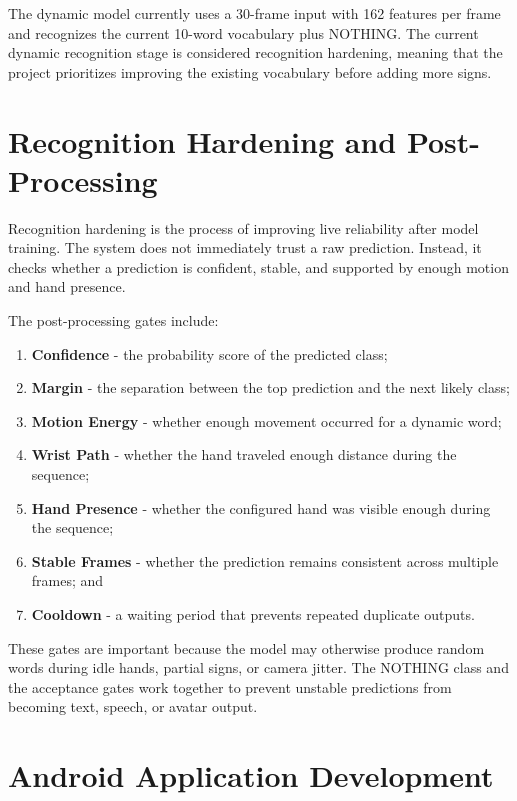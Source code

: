 The dynamic model currently uses a 30-frame input with 162 features per frame and recognizes the current 10-word vocabulary plus NOTHING. The current dynamic recognition stage is considered recognition hardening, meaning that the project prioritizes improving the existing vocabulary before adding more signs.

\section{Recognition Hardening and Post-Processing}

Recognition hardening is the process of improving live reliability after model training. The system does not immediately trust a raw prediction. Instead, it checks whether a prediction is confident, stable, and supported by enough motion and hand presence.

The post-processing gates include:

\begin{enumerate}
    \item \textbf{Confidence} - the probability score of the predicted class;
    \item \textbf{Margin} - the separation between the top prediction and the next likely class;
    \item \textbf{Motion Energy} - whether enough movement occurred for a dynamic word;
    \item \textbf{Wrist Path} - whether the hand traveled enough distance during the sequence;
    \item \textbf{Hand Presence} - whether the configured hand was visible enough during the sequence;
    \item \textbf{Stable Frames} - whether the prediction remains consistent across multiple frames; and
    \item \textbf{Cooldown} - a waiting period that prevents repeated duplicate outputs.
\end{enumerate}

These gates are important because the model may otherwise produce random words during idle hands, partial signs, or camera jitter. The NOTHING class and the acceptance gates work together to prevent unstable predictions from becoming text, speech, or avatar output.

\section{Android Application Development}

